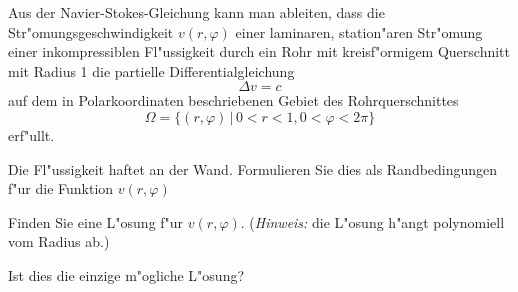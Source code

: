 Aus der Navier-Stokes-Gleichung kann man ableiten, dass die
Str"omungsgeschwindigkeit $v(r,\varphi)$ einer laminaren,
station"aren Str"omung einer inkompressiblen Fl"ussigkeit
durch ein Rohr mit kreisf"ormigem Querschnitt mit Radius 1
die partielle Differentialgleichung
\[
\Delta v=c
\]
auf dem in Polarkoordinaten beschriebenen Gebiet des Rohrquerschnittes
\[
\Omega = \{ (r,\varphi)\,|\,0 < r < 1,0 < \varphi < 2\pi\}
\]
erf"ullt.
\begin{teilaufgaben}
\item Die Fl"ussigkeit haftet an der Wand. Formulieren Sie dies
als Randbedingungen f"ur die Funktion $v(r,\varphi)$
\item Finden Sie eine L"osung f"ur $v(r,\varphi)$. ({\it Hinweis:}
die L"osung h"angt polynomiell vom Radius ab.)
\item Ist dies die einzige m"ogliche L"osung?
\end{teilaufgaben}

